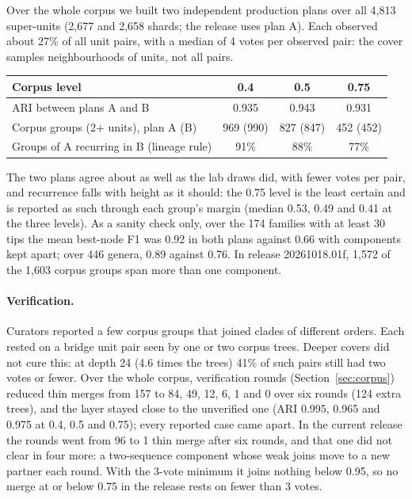 \documentclass[11pt,a4paper]{article}
\begin{document}
Over the whole corpus we built two independent production plans over all 4,813 super-units
(2,677 and 2,658 shards; the release uses plan A). Each observed about 27\% of all unit pairs, with a
median of 4 votes per observed pair: the cover samples neighbourhoods of units, not all pairs.

\begin{center}\small
\begin{tabular}{@{}lccc@{}}
\toprule
Corpus level & 0.4 & 0.5 & 0.75 \\
\midrule
ARI between plans A and B & 0.935 & 0.943 & 0.931 \\
Corpus groups (2+ units), plan A (B) & 969 (990) & 827 (847) & 452 (452) \\
Groups of A recurring in B (lineage rule) & 91\% & 88\% & 77\% \\
\bottomrule
\end{tabular}
\end{center}
The two plans agree about as well as the lab draws did, with fewer votes per pair, and recurrence
falls with height as it should: the 0.75 level is the least certain and is reported as such through
each group's margin (median 0.53, 0.49 and 0.41 at the three levels). As a sanity check only, over
the 174 families with at least 30 tips the mean best-node F1 was 0.92 in both plans against 0.66
with components kept apart; over 446 genera, 0.89 against 0.76. In release 20261018.01f, 1,572 of
the 1,603 corpus groups span more than one component.

\paragraph{Verification.}
Curators reported a few corpus groups that joined clades of different orders. Each rested on a
bridge unit pair seen by one or two corpus trees. Deeper covers did not cure this: at depth 24
(4.6 times the trees) 41\% of such pairs still had two votes or fewer. Over the whole corpus,
verification rounds (Section~\ref{sec:corpus}) reduced thin merges from 157 to 84, 49, 12, 6, 1
and 0 over six rounds (124 extra trees), and the layer stayed close to the unverified one (ARI
0.995, 0.965 and 0.975 at 0.4, 0.5 and 0.75); every reported case came apart. In the current
release the rounds went from 96 to 1 thin merge after six rounds, and that one did not clear in
four more: a two-sequence component whose weak joins move to a new partner each round. With the
3-vote minimum it joins nothing below 0.95, so no merge at or below 0.75 in the release rests on
fewer than 3 votes.
\end{document}
